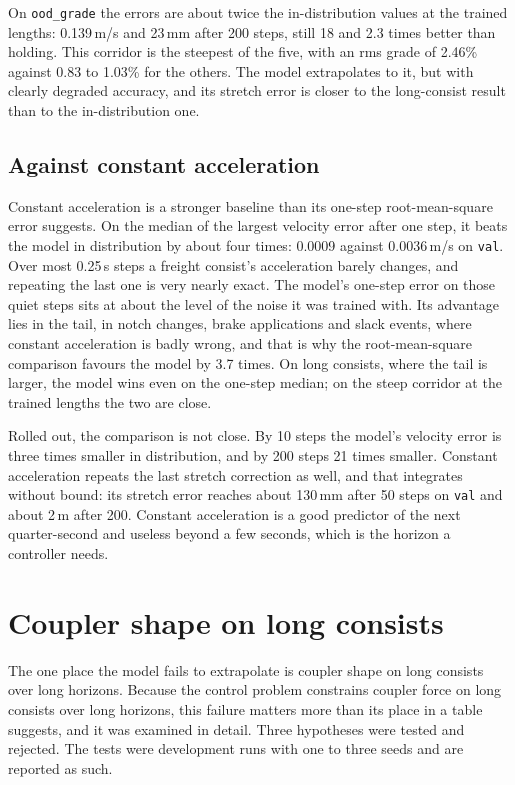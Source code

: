 On \texttt{ood\_grade} the errors are about twice the in-distribution values at the trained lengths: 0.139\,m/s and 23\,mm after 200 steps, still 18 and 2.3 times better than holding. This corridor is the steepest of the five, with an rms grade of 2.46\% against 0.83 to 1.03\% for the others. The model extrapolates to it, but with clearly degraded accuracy, and its stretch error is closer to the long-consist result than to the in-distribution one.

\subsection{Against constant acceleration}

Constant acceleration is a stronger baseline than its one-step root-mean-square error suggests. On the median of the largest velocity error after one step, it beats the model in distribution by about four times: 0.0009 against 0.0036\,m/s on \texttt{val}. Over most 0.25\,s steps a freight consist's acceleration barely changes, and repeating the last one is very nearly exact. The model's one-step error on those quiet steps sits at about the level of the noise it was trained with. Its advantage lies in the tail, in notch changes, brake applications and slack events, where constant acceleration is badly wrong, and that is why the root-mean-square comparison favours the model by 3.7 times. On long consists, where the tail is larger, the model wins even on the one-step median; on the steep corridor at the trained lengths the two are close.

Rolled out, the comparison is not close. By 10 steps the model's velocity error is three times smaller in distribution, and by 200 steps 21 times smaller. Constant acceleration repeats the last stretch correction as well, and that integrates without bound: its stretch error reaches about 130\,mm after 50 steps on \texttt{val} and about 2\,m after 200. Constant acceleration is a good predictor of the next quarter-second and useless beyond a few seconds, which is the horizon a controller needs.

\section{Coupler shape on long consists}
\label{sec:train_shape}

The one place the model fails to extrapolate is coupler shape on long consists over long horizons. Because the control problem constrains coupler force on long consists over long horizons, this failure matters more than its place in a table suggests, and it was examined in detail. Three hypotheses were tested and rejected. The tests were development runs with one to three seeds and are reported as such.

